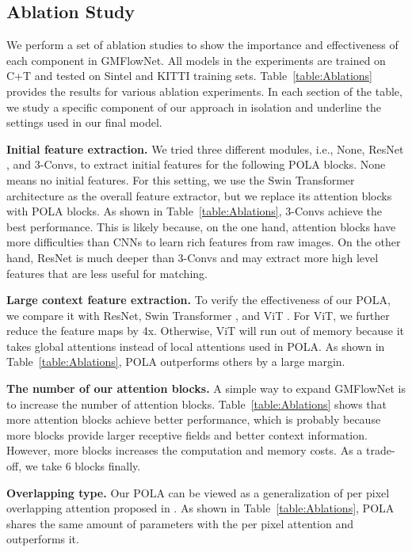 \documentclass[10pt,twocolumn,letterpaper]{article}
\begin{document}
\subsection{Ablation Study}\label{sect:ab_study}

We perform a set of ablation studies to show the importance and effectiveness of each component in GMFlowNet. All models in the experiments are trained on C+T and tested on Sintel and KITTI training sets. Table~\ref{table:Ablations} provides the results for various ablation experiments. In each section of the table, we study a specific component of our approach in isolation and underline the settings used in our final model.

{\bf Initial feature extraction.} We tried three different modules, i.e., None, ResNet \cite{he2016deep}, and 3-Convs, to extract initial features for the following POLA blocks. None means no initial features. For this setting, we use the Swin Transformer architecture as the overall feature extractor,  but we replace its attention blocks with POLA blocks.
As shown in Table~\ref{table:Ablations}, 3-Convs achieve the best performance. This is likely because, on the one hand, attention blocks have more difficulties than CNNs to learn rich features from raw images. On the other hand, ResNet is much deeper than 3-Convs and may extract more high level features that are less useful for matching.

{\bf Large context feature extraction.} To verify the effectiveness of our POLA, we compare it with ResNet, Swin Transformer \cite{liu2021swin}, and ViT \cite{dosovitskiy2021an}. For ViT, we further reduce the feature maps by 4x. Otherwise, ViT will run out of memory because it takes global attentions instead of local attentions used in POLA.
As shown in Table~\ref{table:Ablations}, POLA outperforms others by a large margin. 


{\bf The number of our attention blocks.} A simple way to expand GMFlowNet is to increase the number of attention blocks. Table~\ref{table:Ablations} shows that more attention blocks achieve better performance, which is probably because more blocks provide larger receptive fields and better context information. However, more blocks increases the computation and memory costs. As a trade-off, we take 6 blocks finally.


{\bf Overlapping type.} Our POLA can be viewed as a generalization of per pixel overlapping attention proposed in \cite{ramachandran2019stand}. As shown in Table~\ref{table:Ablations}, POLA shares the same amount of parameters with the per pixel attention and outperforms it.
\end{document}
